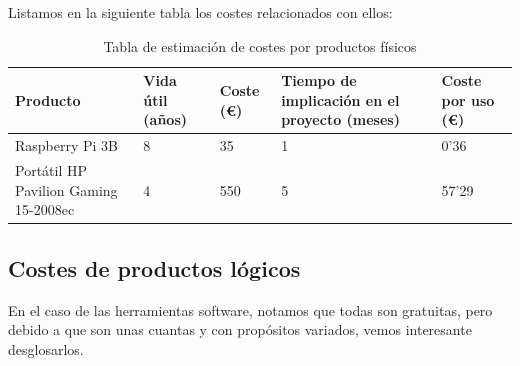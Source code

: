 Listamos en la siguiente tabla los costes relacionados con ellos:

\begin{center}
	\begin{table}[H]
		\centering
		\begin{tabularx}{\textwidth}{|X|X|X|X|X|}
			\hline
			\cellcolor{lightblue}\textbf{Producto} & 
			\cellcolor{lightblue}\textbf{Vida útil (años)} &  \cellcolor{lightblue}\textbf{Coste (€)} &
			\cellcolor{lightblue}\textbf{Tiempo de implicación en el proyecto (meses)} &
			\cellcolor{lightblue}\textbf{Coste por uso (€)} \\
			\hline
			Raspberry Pi 3B & 8 & 35 & 1 & 0'36\\
			\hline
			Portátil HP Pavilion Gaming 15-2008ec & 4 & 550 & 5 & 57'29\\
			\hline
		\end{tabularx}
		\caption{Tabla de estimación de costes por productos físicos}
	\end{table}
\end{center}
\vfill

\subsection{Costes de productos lógicos}
En el caso de las herramientas software, notamos que todas son gratuitas, pero debido a que son unas cuantas y con propósitos variados, vemos interesante desglosarlos.

